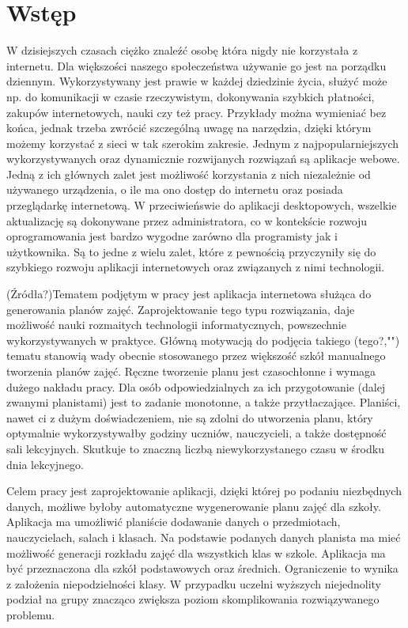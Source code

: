 
\chapter{Wstęp}
W dzisiejszych czasach ciężko znaleźć osobę która nigdy nie korzystała z internetu. Dla większości naszego społeczeństwa używanie go jest na porządku dziennym. Wykorzystywany jest prawie w każdej dziedzinie życia, służyć może np. do komunikacji w czasie rzeczywistym, dokonywania szybkich płatności, zakupów internetowych, nauki czy też pracy. Przykłady można wymieniać bez końca, jednak trzeba zwrócić szczególną uwagę na narzędzia, dzięki którym możemy korzystać z sieci w tak szerokim zakresie. Jednym z najpopularniejszych wykorzystywanych oraz dynamicznie rozwijanych rozwiązań są aplikacje webowe. Jedną z ich głównych zalet jest możliwość korzystania z nich niezależnie od używanego urządzenia, o ile ma ono dostęp do internetu oraz posiada przeglądarkę internetową. W przeciwieńswie do aplikacji desktopowych, wszelkie aktualizację są dokonywane przez administratora, co w kontekście rozwoju oprogramowania jest bardzo wygodne zarówno dla programisty jak i użytkownika. Są to jedne z wielu zalet, które z pewnością przyczyniły się do szybkiego rozwoju aplikacji internetowych oraz związanych z nimi technologii.

(Źródła?)Tematem podjętym w pracy jest aplikacja internetowa służąca do generowania planów zajęć. Zaprojektowanie tego typu rozwiązania, daje możliwość nauki rozmaitych technologii informatycznych, powszechnie wykorzystywanych w praktyce. Główną motywacją do podjęcia takiego (tego?,"") tematu stanowią wady obecnie stosowanego przez większość szkół manualnego tworzenia planów zajęć. Ręczne tworzenie planu jest czasochłonne i wymaga dużego nakładu pracy. Dla osób odpowiedzialnych za ich przygotowanie (dalej zwanymi planistami) jest to zadanie monotonne, a także przytłaczające. Planiści, nawet ci z dużym doświadczeniem, nie są zdolni do utworzenia planu, który optymalnie wykorzystywałby godziny uczniów, nauczycieli, a także dostępność sali lekcyjnych. Skutkuje to znaczną liczbą niewykorzystanego czasu w środku dnia lekcyjnego.

Celem pracy jest zaprojektowanie aplikacji, dzięki której po podaniu niezbędnych danych, możliwe byłoby automatyczne wygenerowanie planu zajęć dla szkoły. Aplikacja ma umożliwić planiście dodawanie danych o przedmiotach, nauczycielach, salach i klasach. Na podstawie podanych danych planista ma mieć możliwość generacji rozkładu zajęć dla wszystkich klas w szkole. Aplikacja ma być przeznaczona dla szkół podstawowych oraz średnich. Ograniczenie to wynika z założenia niepodzielności klasy. W przypadku uczelni wyższych niejednolity podział na grupy znacząco zwiększa poziom skomplikowania rozwiązywanego problemu. 

